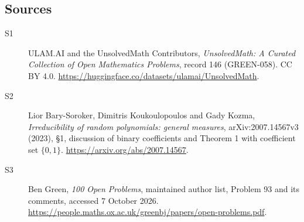 \documentclass[11pt]{article}
\begin{document}
\subsection{Sources}
\begin{description}
\item[\hypertarget{source:146:1}{S1}] ULAM.AI and the UnsolvedMath Contributors, \emph{UnsolvedMath: A Curated Collection of Open Mathematics Problems}, record 146 (GREEN-058). CC BY 4.0. \url{https://huggingface.co/datasets/ulamai/UnsolvedMath}.
\item[\hypertarget{source:146:2}{S2}] Lior Bary-Soroker, Dimitris Koukoulopoulos and Gady Kozma, \emph{Irreducibility of random polynomials: general measures}, arXiv:2007.14567v3 (2023), §1, discussion of binary coefficients and Theorem 1 with coefficient set $\{0,1\}$. \url{https://arxiv.org/abs/2007.14567}.
\item[\hypertarget{source:146:3}{S3}] Ben Green, \emph{100 Open Problems}, maintained author list, Problem 93 and its comments, accessed 7 October 2026. \url{https://people.maths.ox.ac.uk/greenbj/papers/open-problems.pdf}.
\end{description}
\label{end:146}
\end{document}
